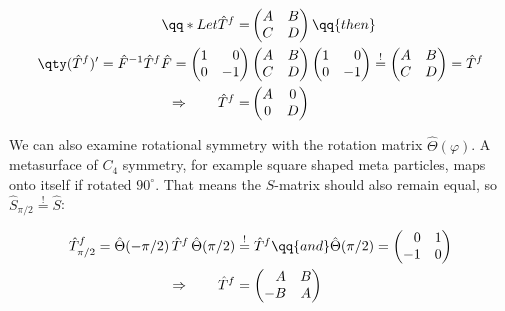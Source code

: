 \begin{equation}
\begin{aligned}
    \qq*{Let} \hat T^f =
    &\begin{pmatrix}
        A & B \\
        C & D
    \end{pmatrix}
    \qq{then} \\
    \qty(\hat T^f)' =
    \hat F^{-1} \hat T^f \hat F =
    \begin{pmatrix}
        1 & \phantom{-} 0 \\
        0 & -           1
    \end{pmatrix}
    &\begin{pmatrix}
        A & B \\
        C & D
    \end{pmatrix}
    \begin{pmatrix}
        1 & \phantom{-} 0 \\
        0 & -           1
    \end{pmatrix}
    \stackrel{!}{=}
    \begin{pmatrix}
        A & B \\
        C & D
    \end{pmatrix} =
    \hat T^f \\
    \Rightarrow \qquad
    \hat T^f =
    &\begin{pmatrix}
        A & 0 \\
        0 & D
    \end{pmatrix}
\end{aligned}
\end{equation}

We can also examine rotational symmetry with the rotation matrix $\hat \Theta(\varphi)$. A metasurface of $C_4$ symmetry, for example square shaped meta particles, maps onto itself if rotated $90^\circ$. That means the $S$-matrix should also remain equal, so
$\hat S_{\pi/2} \stackrel{!}{=} \hat S$:

\begin{equation}
\begin{aligned}
    \hat T^f_{\pi/2} =
    \hat \Theta(-\pi/2) \,
    \hat T^f \,
    \hat \Theta(\pi/2)
    &\stackrel{!}{=}
    \hat T^f
    \qq{and}
    \hat \Theta(\pi/2) =
    \begin{pmatrix}
        \phantom{-} 0 & 1 \\
        -1 & 0
    \end{pmatrix} \\
    \Rightarrow \qquad
    \hat T^f &=
    \begin{pmatrix}
        \phantom{-} A & B \\
        -           B & A
    \end{pmatrix}
\end{aligned}
\end{equation}

